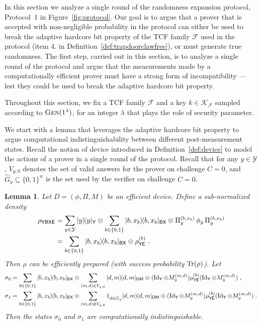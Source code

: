 \documentclass[11pt]{article}
\newtheorem{lemma}[theorem]{Lemma}
\theoremstyle{remark}
\theoremstyle{definition}
\newcommand{\ket}[1]{|#1\rangle}
\newcommand{\bra}[1]{\langle#1|}
\newcommand{\proj}[1]{\ket{#1}\!\bra{#1}}
\newcommand{\Tr}{\mbox{\rm Tr}}
\newcommand{\Id}{\ensuremath{\mathop{\rm Id}\nolimits}}
\newcommand{\reg}[1]{{\textsf{#1}}}
\newcommand{\mF}{\ensuremath{\mathcal{F}}}
\newcommand{\mK}{\ensuremath{\mathcal{K}}}
\newcommand{\mY}{\ensuremath{\mathcal{Y}}}
\newcommand{\dset}{G}
\newcommand{\Gen}{\textsc{Gen}}
\begin{document}
In this section we analyze a single round of the randomness expansion protocol, Protocol~1 in Figure~\ref{fig:protocol}. Our goal is to argue that a prover that is accepted with non-negligible probability in the protocol can either be used to break the adaptive hardcore bit property of the TCF family $\mathcal{F}$ used in the protocol (item 4. in Definition~\ref{def:trapdoorclawfree}), or must generate true randomness. The first step, carried out in this section, is to analyze a single round of the protocol and argue that the measurements made by a computationally efficient prover must have a strong form of incompatibility --- lest they could be used to break the adaptive hardcore bit property.

Throughout this section, we fix a TCF family $\mathcal{F}$ and a key $k\in \mK_\mF$ sampled according to $\Gen(1^\lambda)$, for an integer $\lambda$ that plays the role of security parameter. 

We start with a lemma that leverages the adaptive hardcore bit property to argue computational indistinguishability between different post-measurement states. Recall the notion of device introduced in Definition~\ref{def:device} to model the actions of a prover in a single round of the protocol. 
Recall that for any $y\in\mY$, $V_{y,0}$ denotes the set of valid answers for the prover on challenge $C=0$, and $\hat{\dset}_y\subseteq\{0,1\}^w$ is the set used by the verifier on challenge $C=0$. 

\begin{lemma} \label{lem:break}
Let $D = (\phi,\Pi,M)$ be an efficient device. Define a sub-normalized density 
\begin{align}
\rho_{\reg{YBXE}} &= \sum_{y\in\mY} \proj{y}_\reg{Y}\otimes \sum_{b\in\{0,1\}} \proj{b,x_b}_\reg{BX} \otimes \Pi_y^{(b,x_b)} \,\phi_y \,\Pi_y^{(b,x_b)}\notag\\
&=  \sum_{b\in\{0,1\}} \proj{b,x_b}_\reg{BX} \otimes \rho^{(b)}_\reg{YE}\;.\label{eq:def-sigmay}
\end{align}
Then $\rho$ can be efficiently prepared (with success probability $\Tr(\rho)$). Let
\begin{align}
\sigma_0 &=\sum_{b\in\{0,1\}} \proj{b,x_b}_{\reg{BX}} \otimes  \sum_{(m,d) \in {V}_{y,0}} \proj{d,m}_{\reg{DM}}\otimes (\Id_\reg{Y}\otimes M_y^{(m,d)}) \rho^{(b)}_{\reg{YE}} (\Id_\reg{Y}\otimes M_y^{(m,d)})\;,\notag\\
 \sigma_1 &=\sum_{b\in\{0,1\}} \proj{b,x_b}_{\reg{BX}} \otimes  \sum_{(m,d)\notin V_{y,0}} 1_{d\in \hat{\dset}_{y} } \proj{d,m}_{\reg{DM}}\otimes (\Id_\reg{Y}\otimes M_y^{(m,d)}) \rho^{(b)}_{\reg{YE}} (\Id_\reg{Y}\otimes M_y^{(m,d)})\;.\label{eq:def-rho}
\end{align}
Then the states $\sigma_0$ and $\sigma_1$ are computationally indistinguishable. 
\end{lemma}
\end{document}
